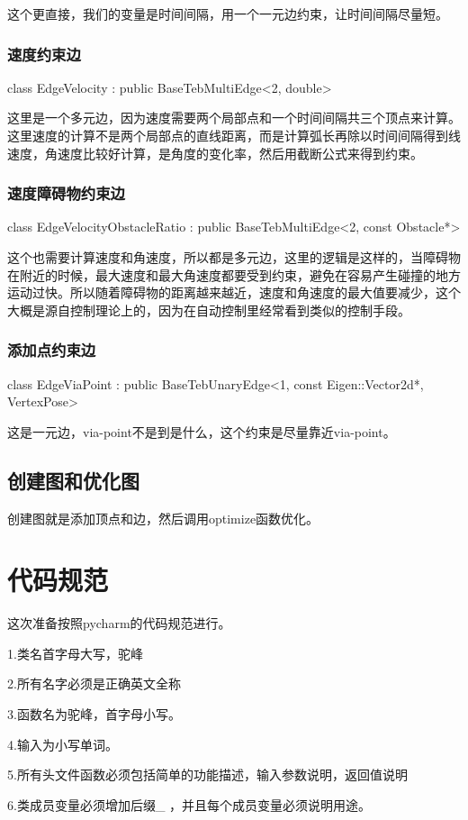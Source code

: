 \documentclass[10pt,a4paper]{article}
\theoremstyle{mythm}
\numberwithin{equation}{section}
\begin{document}
这个更直接，我们的变量是时间间隔，用一个一元边约束，让时间间隔尽量短。

\subsubsection{速度约束边}
class EdgeVelocity : public BaseTebMultiEdge<2, double>

这里是一个多元边，因为速度需要两个局部点和一个时间间隔共三个顶点来计算。这里速度的计算不是两个局部点的直线距离，而是计算弧长再除以时间间隔得到线速度，角速度比较好计算，是角度的变化率，然后用截断公式来得到约束。

\subsubsection{速度障碍物约束边}
class EdgeVelocityObstacleRatio : public BaseTebMultiEdge<2, const Obstacle*>

这个也需要计算速度和角速度，所以都是多元边，这里的逻辑是这样的，当障碍物在附近的时候，最大速度和最大角速度都要受到约束，避免在容易产生碰撞的地方运动过快。所以随着障碍物的距离越来越近，速度和角速度的最大值要减少，这个大概是源自控制理论上的，因为在自动控制里经常看到类似的控制手段。

\subsubsection{添加点约束边}
class EdgeViaPoint : public BaseTebUnaryEdge<1, const Eigen::Vector2d*, VertexPose>

这是一元边，via-point不是到是什么，这个约束是尽量靠近via-point。

\subsection{创建图和优化图}
创建图就是添加顶点和边，然后调用optimize函数优化。
\section{代码规范}
这次准备按照pycharm的代码规范进行。

1.类名首字母大写，驼峰

2.所有名字必须是正确英文全称

3.函数名为驼峰，首字母小写。

4.输入为小写单词。

5.所有头文件函数必须包括简单的功能描述，输入参数说明，返回值说明

6.类成员变量必须增加后缀\_ ，并且每个成员变量必须说明用途。
\end{document}
